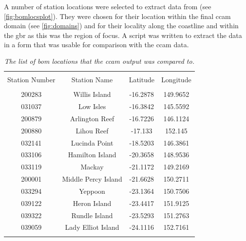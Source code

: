 A number of station locations were selected to extract data from (see \cref{fig:bomlocsplot}). They were chosen for their location within the final \gls{ccam} domain (see \cref{fig:domains}) and for their locality along the coastline and within the \gls{gbr} as this was the region of focus. A script was written to extract the data in a form that was usable for comparison with the \gls{ccam} data.

\begin{table}[tbh!]
	\caption{\textsl{ The list of \gls{bom} locations that the \gls{ccam} output was compared to. }}
	\centering
		\begin{tabular}{c c c c} \\
			\hline 	\\ 	[-1ex]
			Station Number	&	Station Name	&	Latitude	&	Longitude	\\	[1ex]
			\hline	\\	[-1ex]						
			200283		&	Willis Island		&	-16.2878	&	149.9652	\\	
			031037		&	Low Isles			&	-16.3842	&	145.5592	\\	
			200879		&	Arlington Reef		&	-16.7226	&	146.1124	\\	
			200880		&	Lihou Reef			&	-17.133		&	152.145		\\	
			032141		&	Lucinda Point		&	-18.5203	&	146.3861	\\	
			033106		&	Hamilton Island		&	-20.3658	&	148.9536	\\	
			033119		&	Mackay				&	-21.1172	&	149.2169	\\	
			200001		&	Middle Percy Island	&	-21.6628	&	150.2711	\\	
			033294		&	Yeppoon				&	-23.1364	&	150.7506	\\	
			039122		&	Heron Island		&	-23.4417	&	151.9125	\\	
			039322		&	Rundle Island		&	-23.5293	&	151.2763	\\	
			039059		&	Lady Elliot Island	&	-24.1116	&	152.7161	\\	[1ex]
			\hline \\
		\end{tabular}
	\label{tab:bomlocs}
\end{table}

